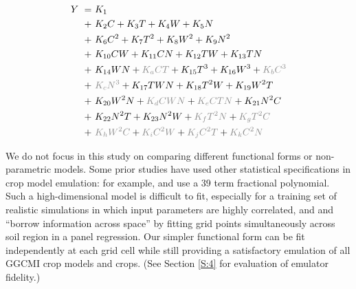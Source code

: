 \documentclass[gmd, manuscript]{copernicus} %
\begin{document}
\begin{align}
    \label{eqn:features_original}
    Y\ = \ & K_{1}  \\
    + \ & K_{2} C     + K_{3} T      + K_{4} W      + K_{5} N   \nonumber \\
    + \ & K_{6} C^2   + K_{7} T^2    + K_{8} W^2    + K_{9} N^2 \nonumber \\
    + \ & K_{10} C W  + K_{11} C N   + K_{12} T W   + K_{13} T N \nonumber \\
    + \ & K_{14} W N  +{\color{dark-gray}K_{a} C T} + K_{15} T^3  + K_{16} W^3  + {\color{dark-gray}K_{b} C^3} \nonumber \\
    + \ & {\color{dark-gray}K_{c} N^3} + K_{17} T W N + K_{18} T^2 W + K_{19} W^2 T \nonumber \\
    + \ & K_{20} W^2 N + {\color{dark-gray}K_{d} C W N} + {\color{dark-gray}K_{e} C T N} + K_{21} N^2 C \nonumber \\
    + \ & K_{22} N^2 T + K_{23} N^2 W + {\color{dark-gray}K_{f} T^2 N} + {\color{dark-gray}K_{g} T^2 C}  \nonumber \\
    + \ & {\color{dark-gray}K_{h} W^2 C} + {\color{dark-gray}K_{i} C^2 W} + {\color{dark-gray}K_{j} C^2 T} + {\color{dark-gray}K_{k} C^2 N} \nonumber
\end{align}

We do not focus in this study on comparing different functional forms or non-parametric models.
Some prior studies have used other statistical specifications in crop model emulation: for example, \citet{BLANC2015} and \citet{BLANC2017} use a 39 term fractional polynomial. 
Such a high-dimensional model is difficult to fit, especially for a training set of realistic simulations in which input parameters are highly correlated, and  \citet{BLANC2015} and \citet{BLANC2017}  ``borrow information across space'' by fitting grid points simultaneously across soil region in a panel regression. 
Our simpler functional form can be fit independently at each grid cell while still providing a satisfactory emulation of all GGCMI crop models and crops. 
(See Section \ref{S:4} for evaluation of emulator fidelity.)
\end{document}
